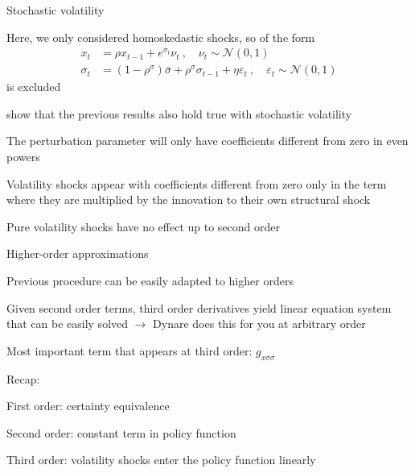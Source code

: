 \renewcommand{\Source}{\textcite{FVetal2010a}}
\begin{frame}{Stochastic volatility}
  \begin{witemize}
    \item Here, we only considered homoskedastic shocks, so  of the form
    \begin{align}
      x_t        & =\rho x_{t-1}+e^{\sigma_{t}}\nu_{t}\ ,\quad\nu_{t}\sim\mathcal{N}(0,1)                                                             \\
      \sigma_{t} & =\left(1-\rho^{\sigma}\right)\bar{\sigma}+\rho^{\sigma}\sigma_{t-1}+\eta\varepsilon_{t}\ ,\quad\varepsilon_{t}\sim\mathcal{N}(0,1)
    \end{align}
    is excluded
    \item \textcite{FVetal2010a} show that the previous results also hold true with stochastic volatility
    \item The perturbation parameter will only have coefficients different from zero in even powers
    \item Volatility shocks appear with coefficients different from zero only in the term where they are multiplied by the innovation to their own
    structural shock
    \item[$\Rightarrow$] Pure volatility shocks have no effect up to second order
  \end{witemize}
\end{frame}


\begin{frame}{Higher-order approximations}
  \begin{witemize}
    \item Previous procedure can be easily adapted to higher orders
    \item Given second order terms, third order derivatives yield linear equation system that can be easily solved
    $\rightarrow$ Dynare does this for you at arbitrary order
    \item Most important term that appears at third order: $g_{x\sigma\sigma}$
    \item Recap:
    \begin{witemize}
      \item First order: certainty equivalence
      \item Second order: constant term in policy function
      \item Third order: volatility shocks enter the policy function linearly
    \end{witemize}
  \end{witemize}
\end{frame}

